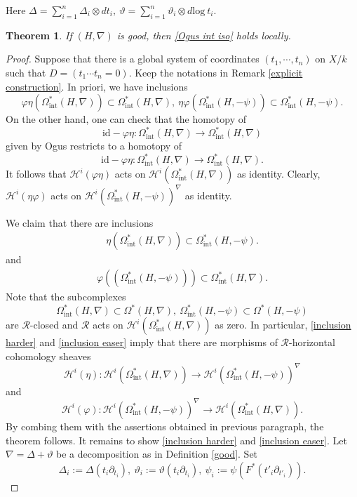 \documentclass[12pt, a4paper]{article}
\newtheorem{theorem}{Theorem}[section]
\begin{document}
 Here
$
\Delta=\sum_{i=1}^n\Delta_i\otimes dt_i,~\vartheta=\sum_{i=1}^n\vartheta_i\otimes d\mathrm{log}~t_i.
$
\fi
\begin{theorem}\label{Ogus comp int}
If $(H,\nabla)$ is good, then \eqref{Ogus int iso} holds locally.
\end{theorem}
\begin{proof}
Suppose that there is a global system of coordinates $(t_1,\cdots,t_n)$ on $X/k$ such that $D=(t_1\cdots t_n=0)$. Keep the notations in Remark \ref{explicit construction}. In priori, we have inclusions
$$
\varphi\eta(\Omega^*_\mathrm{int}(H,\nabla))\subset\Omega^*_\mathrm{int}(H,\nabla),~\eta\varphi(\Omega^*_\mathrm{int}(H,-\psi))\subset\Omega^*_\mathrm{int}(H,-\psi).
$$
On the other hand, one can check that the homotopy of 
$$
\mathrm{id}-\varphi\eta:\Omega^*_\mathrm{int}(H,\nabla)\to\Omega^*_\mathrm{int}(H,\nabla)
$$
given by Ogus restricts to a homotopy of
$$
\mathrm{id}-\varphi\eta:\Omega^*_\mathrm{int}(H,\nabla)\to\Omega^*_\mathrm{int}(H,\nabla).
$$
It follows that $\mathcal H^i(\varphi\eta)$ acts on $\mathcal H^i(\Omega_\mathrm{int}^*(H,\nabla))$ as identity. Clearly, $\mathcal H^i(\eta\varphi)$ acts on $\mathcal H^i(\Omega_\mathrm{int}^*(H,-\psi))^\nabla$ as identity. 

We claim that there are inclusions 
\begin{eqnarray}\label{inclusion harder}
\eta(\Omega^*_\mathrm{int}(H,\nabla))\subset\Omega_\mathrm{int}^*(H,-\psi).
\end{eqnarray}
and
\begin{eqnarray}\label{inclusion easer}
\varphi((\Omega_\mathrm{int}^*(H,-\psi)))\subset\Omega^*_\mathrm{int}(H,\nabla).
\end{eqnarray}
Note that the subcomplexes
$$
\Omega^*_\mathrm{int}(H,\nabla)\subset\Omega^*(H,\nabla),~\Omega^*_\mathrm{int}(H,-\psi)\subset\Omega^*(H,-\psi)
$$
are $\mathcal R$-closed and $\mathcal R$ acts on $\mathcal H^i(\Omega_\mathrm{int}^*(H,\nabla))$ as zero. In particular, \eqref{inclusion harder} and \eqref{inclusion easer} imply that there are morphisms of $\mathcal R$-horizontal cohomology sheaves 
$$
\mathcal H^i(\eta):\mathcal H^i(\Omega_\mathrm{int}^*(H,\nabla))\to\mathcal H^i(\Omega_\mathrm{int}^*(H,-\psi))^\nabla
$$
and
$$
\mathcal H^i(\varphi):\mathcal H^i(\Omega_\mathrm{int}^*(H,-\psi))^\nabla\to\mathcal H^i(\Omega_\mathrm{int}^*(H,\nabla)).
$$
By combing them with the assertions obtained in previous paragraph, the theorem follows. It remains to show  \eqref{inclusion harder} and \eqref{inclusion easer}. Let $\nabla=\Delta+\vartheta$ be a decomposition as in  Definition \ref{good}. Set 
$$
\Delta_i:=\Delta(t_i\partial_{t_i}),~\vartheta_i:=\vartheta(t_i\partial_{t_i}),~\psi_i:=\psi(F^*(t'_i\partial_{t'_i})).
$$


\end{proof}
\end{document}
